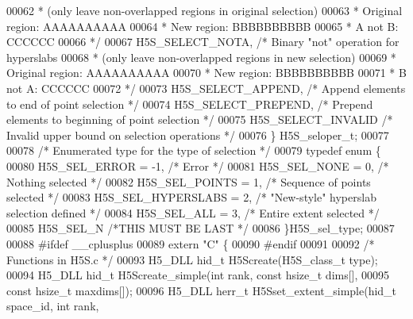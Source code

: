 \begin{DoxyCode}
00062 \textcolor{comment}{                                 * (only leave non-overlapped regions in original selection)}
00063 \textcolor{comment}{                                 * Original region:  AAAAAAAAAA}
00064 \textcolor{comment}{                                 * New region:             BBBBBBBBBB}
00065 \textcolor{comment}{                                 * A not B:          CCCCCC}
00066 \textcolor{comment}{                                 */}
00067     H5S\_SELECT\_NOTA,            \textcolor{comment}{/* Binary "not" operation for hyperslabs}
00068 \textcolor{comment}{                                 * (only leave non-overlapped regions in new selection)}
00069 \textcolor{comment}{                                 * Original region:  AAAAAAAAAA}
00070 \textcolor{comment}{                                 * New region:             BBBBBBBBBB}
00071 \textcolor{comment}{                                 * B not A:                    CCCCCC}
00072 \textcolor{comment}{                                 */}
00073     H5S\_SELECT\_APPEND,          \textcolor{comment}{/* Append elements to end of point selection */}
00074     H5S\_SELECT\_PREPEND,         \textcolor{comment}{/* Prepend elements to beginning of point selection */}
00075     H5S\_SELECT\_INVALID          \textcolor{comment}{/* Invalid upper bound on selection operations */}
00076 \} H5S\_seloper\_t;
00077 
00078 \textcolor{comment}{/* Enumerated type for the type of selection */}
00079 \textcolor{keyword}{typedef} \textcolor{keyword}{enum} \{
00080     H5S\_SEL\_ERROR   = -1,   \textcolor{comment}{/* Error            */}
00081     H5S\_SEL\_NONE    = 0,    \textcolor{comment}{/* Nothing selected         */}
00082     H5S\_SEL\_POINTS  = 1,    \textcolor{comment}{/* Sequence of points selected  */}
00083     H5S\_SEL\_HYPERSLABS  = 2,    \textcolor{comment}{/* "New-style" hyperslab selection defined  */}
00084     H5S\_SEL\_ALL     = 3,    \textcolor{comment}{/* Entire extent selected   */}
00085     H5S\_SEL\_N           \textcolor{comment}{/*THIS MUST BE LAST     */}
00086 \}H5S\_sel\_type;
00087 
00088 \textcolor{preprocessor}{#ifdef \_\_cplusplus}
00089 \textcolor{keyword}{extern} \textcolor{stringliteral}{"C"} \{
00090 \textcolor{preprocessor}{#endif}
00091 
00092 \textcolor{comment}{/* Functions in H5S.c */}
00093 H5\_DLL hid\_t H5Screate(H5S\_class\_t type);
00094 H5\_DLL hid\_t H5Screate\_simple(\textcolor{keywordtype}{int} rank, \textcolor{keyword}{const} hsize\_t dims[],
00095                    \textcolor{keyword}{const} hsize\_t maxdims[]);
00096 H5\_DLL herr\_t H5Sset\_extent\_simple(hid\_t space\_id, \textcolor{keywordtype}{int} rank,

\end{DoxyCode}

